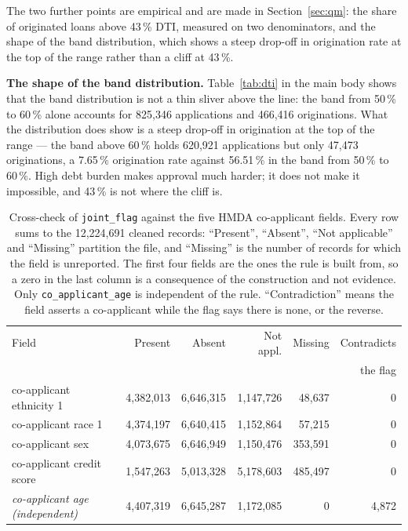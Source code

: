\documentclass[sigconf,balance=false]{acmart}
\begin{document}
The two further points are empirical and are made in
Section~\ref{sec:qm}: the share of originated loans above 43\,\% DTI,
measured on two denominators, and the shape of the band distribution, which
shows a steep drop-off in origination rate at the top of the range rather
than a cliff at 43\,\%.

\textbf{The shape of the band distribution.} Table~\ref{tab:dti} in the main
body shows that the band distribution is not a thin sliver above the line:
the band from 50\,\% to 60\,\% alone accounts for 825{,}346 applications
and 466{,}416 originations. What the distribution does show is a steep
drop-off in origination at the top of the range --- the band above 60\,\%
holds 620{,}921 applications but only 47{,}473 originations, a 7.65\,\%
origination rate against 56.51\,\% in the band from 50\,\% to 60\,\%. High
debt burden makes approval much harder; it does not make it impossible,
and 43\,\% is not where the cliff is.

\begin{table}[t]
\caption{Cross-check of \texttt{joint\_\allowbreak flag} against the five HMDA
         co-applicant fields. Every row sums to the 12{,}224{,}691 cleaned
         records: ``Present'', ``Absent'', ``Not applicable'' and ``Missing''
         partition the file, and ``Missing'' is the number of records for
         which the field is unreported. The first four fields are the ones
         the rule is built from, so a zero in the last column is a
         consequence of the construction and not evidence. Only
         \texttt{co\_\allowbreak applicant\_\allowbreak age} is
         independent of the rule. ``Contradiction'' means the field asserts
         a co-applicant while the flag says there is none, or the reverse.}
\label{tab:crosscheck}
\centering
\scriptsize
\begin{tabular}{@{}lrrrrr@{}}
\toprule
Field & Present & Absent & Not appl. & Missing & Contradicts \\
      &         &        &         &         & the flag \\
\midrule
co-applicant ethnicity 1 & 4{,}382{,}013 & 6{,}646{,}315 & 1{,}147{,}726 & 48{,}637 & 0 \\
co-applicant race 1      & 4{,}374{,}197 & 6{,}640{,}415 & 1{,}152{,}864 & 57{,}215 & 0 \\
co-applicant sex        & 4{,}073{,}675 & 6{,}646{,}949 & 1{,}150{,}476 & 353{,}591 & 0 \\
co-applicant credit score & 1{,}547{,}263 & 5{,}013{,}328 & 5{,}178{,}603 & 485{,}497 & 0 \\
\emph{co-applicant age (independent)} & 4{,}407{,}319 & 6{,}645{,}287 & 1{,}172{,}085 & 0 & 4{,}872 \\
\bottomrule
\end{tabular}
\end{table}
\end{document}
